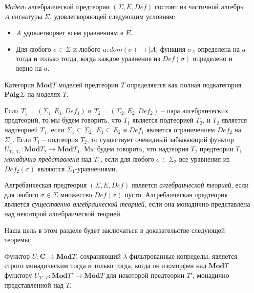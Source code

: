\documentclass{amsart}
\theoremstyle{definition}
\theoremstyle{remark}
\newcommand{\cat}[1]{\mathbf{#1}}
\renewcommand{\C}{\cat{C}}
\numberwithin{figure}{section}
\begin{document}
\emph{Модель} алгебраической предтеории $(\Sigma, E, Def)$ состоит из частичной алгебры $A$ сигнатуры $\Sigma$, удовлетворяющей следующим условиям:
\begin{itemize}
\item $A$ удовлетворяет всем уравнениям в $E$.
\item Для любого $\sigma \in \Sigma$ и любого $a : dom(\sigma) \to |A|$ функция $\sigma_A$ определена на $a$ тогда и только тогда, когда каждое уравнение из $Def(\sigma)$ определено и верно на $a$.
\end{itemize}
Категория $\cat{Mod}T$ моделей предтеории $T$ определяется как полная подкатегория $\cat{Palg}\Sigma$ на моделях $T$.

Если $T_1 = (\Sigma_1, E_1, Def_1)$ и $T_2 = (\Sigma_2, E_2, Def_2)$ -- пара алгебраических предтеорий, то мы будем говорить, что $T_1$ является подтеорией $T_2$, и $T_2$ является надтеорией $T_1$, если $\Sigma_1 \subseteq \Sigma_2$, $E_1 \subseteq E_2$ и $Def_1$ является ограничением $Def_2$ на $\Sigma_1$.
Если $T_1$ -- подтеория $T_2$, то существует очевидный забывающий функтор $U_{T_2,T_1} : \cat{Mod}T_2 \to \cat{Mod}T_1$.
Мы будем говорить, что надтеория $T_2$ предтеории $T_1$ \emph{монадично представлена} над $T_1$, если для любого $\sigma \in \Sigma_2$ все уравнения из $Def_2(\sigma)$ являются $\Sigma_1$-уравнениями.

Алгребаическая предтеория $(\Sigma, E, Def)$ является \emph{алгебраической теорией}, если для любого $\sigma \in \Sigma$ множество $Def(\sigma)$ пусто.
Алгребаическая предтеория является \emph{существенно алгебраической теорией}, если она монадично представлена над некоторой алгебраической теорией.

Наша цель в этом разделе будет заключаться в доказательстве следующей теоремы:
\begin{thm}
Функтор $U : \C \to \cat{Mod}T$, сохраняющий $\lambda$-фильтрованные копределы, является строго монадическим тогда и только тогда, когда он изоморфен над $\cat{Mod}T$ функтору $U_{T',T} : \cat{Mod}T' \to \cat{Mod}T$ для некоторой предтеории $T'$, монадично представленной над $T$.
\end{thm}
\end{document}
